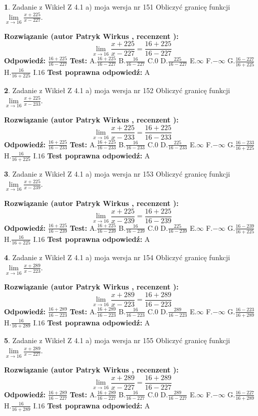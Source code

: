 \documentclass[12pt, a4paper]{article}
\theoremstyle{definition} %
\newtheorem{zad}{}
\newcommand{\zadStart}[1]{\begin{zad}#1\newline}
\newcommand{\zadStop}{\end{zad}}
\newcommand{\rozwStart}[2]{\noindent \textbf{Rozwiązanie (autor #1 , recenzent #2): }\newline}
\newcommand{\rozwStop}{\newline}
\newcommand{\odpStart}{\noindent \textbf{Odpowiedź:}\newline}
\newcommand{\odpStop}{\newline}
\newcommand{\testStart}{\noindent \textbf{Test:}\newline}
\newcommand{\testStop}{\newline}
\newcommand{\kluczStart}{\noindent \textbf{Test poprawna odpowiedź:}\newline}
\newcommand{\kluczStop}{\newline}
\begin{document}
\zadStart{Zadanie z Wikieł Z 4.1 a) moja wersja nr 151}
Obliczyć granicę funkcji $\lim\limits_{x\to16}\frac{x+225}{x-227}$.
\zadStop
\rozwStart{Patryk Wirkus}{}
$$\lim\limits_{x\to16}\frac{x+225}{x-227} = \frac{16+225}{16-227}$$
\rozwStop
\odpStart
$\frac{16+225}{16-227}$
\odpStop
\testStart
A.$\frac{16+225}{16-227}$
B.$\frac{16}{16-227}$
C.$0$
D.$\frac{225}{16-227}$
E.$\infty$
F.$-\infty$
G.$\frac{16-227}{16+225}$
H.$\frac{16}{16+225}$
I.$16$
\testStop
\kluczStart
A
\kluczStop



\zadStart{Zadanie z Wikieł Z 4.1 a) moja wersja nr 152}
Obliczyć granicę funkcji $\lim\limits_{x\to16}\frac{x+225}{x-233}$.
\zadStop
\rozwStart{Patryk Wirkus}{}
$$\lim\limits_{x\to16}\frac{x+225}{x-233} = \frac{16+225}{16-233}$$
\rozwStop
\odpStart
$\frac{16+225}{16-233}$
\odpStop
\testStart
A.$\frac{16+225}{16-233}$
B.$\frac{16}{16-233}$
C.$0$
D.$\frac{225}{16-233}$
E.$\infty$
F.$-\infty$
G.$\frac{16-233}{16+225}$
H.$\frac{16}{16+225}$
I.$16$
\testStop
\kluczStart
A
\kluczStop



\zadStart{Zadanie z Wikieł Z 4.1 a) moja wersja nr 153}
Obliczyć granicę funkcji $\lim\limits_{x\to16}\frac{x+225}{x-239}$.
\zadStop
\rozwStart{Patryk Wirkus}{}
$$\lim\limits_{x\to16}\frac{x+225}{x-239} = \frac{16+225}{16-239}$$
\rozwStop
\odpStart
$\frac{16+225}{16-239}$
\odpStop
\testStart
A.$\frac{16+225}{16-239}$
B.$\frac{16}{16-239}$
C.$0$
D.$\frac{225}{16-239}$
E.$\infty$
F.$-\infty$
G.$\frac{16-239}{16+225}$
H.$\frac{16}{16+225}$
I.$16$
\testStop
\kluczStart
A
\kluczStop



\zadStart{Zadanie z Wikieł Z 4.1 a) moja wersja nr 154}
Obliczyć granicę funkcji $\lim\limits_{x\to16}\frac{x+289}{x-223}$.
\zadStop
\rozwStart{Patryk Wirkus}{}
$$\lim\limits_{x\to16}\frac{x+289}{x-223} = \frac{16+289}{16-223}$$
\rozwStop
\odpStart
$\frac{16+289}{16-223}$
\odpStop
\testStart
A.$\frac{16+289}{16-223}$
B.$\frac{16}{16-223}$
C.$0$
D.$\frac{289}{16-223}$
E.$\infty$
F.$-\infty$
G.$\frac{16-223}{16+289}$
H.$\frac{16}{16+289}$
I.$16$
\testStop
\kluczStart
A
\kluczStop



\zadStart{Zadanie z Wikieł Z 4.1 a) moja wersja nr 155}
Obliczyć granicę funkcji $\lim\limits_{x\to16}\frac{x+289}{x-227}$.
\zadStop
\rozwStart{Patryk Wirkus}{}
$$\lim\limits_{x\to16}\frac{x+289}{x-227} = \frac{16+289}{16-227}$$
\rozwStop
\odpStart
$\frac{16+289}{16-227}$
\odpStop
\testStart
A.$\frac{16+289}{16-227}$
B.$\frac{16}{16-227}$
C.$0$
D.$\frac{289}{16-227}$
E.$\infty$
F.$-\infty$
G.$\frac{16-227}{16+289}$
H.$\frac{16}{16+289}$
I.$16$
\testStop
\kluczStart
A
\kluczStop
\end{document}
